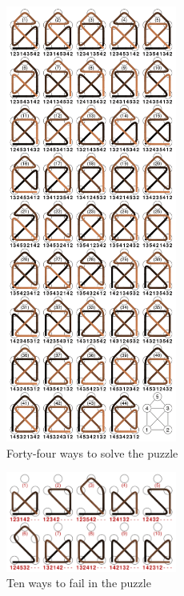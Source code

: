 \documentclass[
  12pt,
  oneside]{book}
\theoremstyle{definition}
\theoremstyle{definition}
\theoremstyle{definition}
\theoremstyle{definition}
\theoremstyle{remark}
\begin{document}
\begin{figure}
\centering
\includegraphics[width=0.5\textwidth,height=\textheight]{fig/nikolaus2.png}
\caption[\label{fig:nikolaus2} Forty-four ways to solve the puzzle]{\label{fig:nikolaus2} Forty-four ways to solve the puzzle\footnotemark{}}
\end{figure}

\begin{figure}
\centering
\includegraphics[width=0.5\textwidth,height=\textheight]{fig/nikolaus3.png}
\caption[\label{fig:nikolaus3} Ten ways to fail in the puzzle]{\label{fig:nikolaus3} Ten ways to fail in the puzzle\footnotemark{}}
\end{figure}
\end{document}

